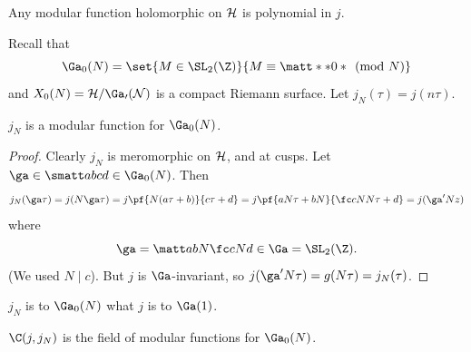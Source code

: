 \begin{cor}
Any modular function holomorphic on $\cal H$ is polynomial in $j$.
\end{cor}
Recall that
\[
\Ga_0(N)=\set{M\in \SL_2(\Z)}{M\equiv \matt **0* \pmod{N}}
\]
and $X_0(N)=\cal H/\Ga_0(N)$ is a compact Riemann surface. Let $j_N(\tau)=j(n\tau)$.
\begin{thm}
$j_N$ is a modular function for $\Ga_0(N)$. 
\end{thm}
\begin{proof}
Clearly $j_N$ is meromorphic %
on $\cal H$, and at cusps. Let $\ga\in \smatt abcd\in \Ga_0(N)$. Then
\[
j_N(\ga \tau)=j(N\ga \tau)=j\pf{N(a\tau+b)}{c\tau+d}=
j\pf{aN\tau+bN}{\fc cNN\tau +d}=j(\ga'Nz)
\]
where
\[
\ga=\matt a{bN}{\fc cN}d\in \Ga=\SL_2(\Z).
\]
(We used $N\mid c$). But $j$ is $\Ga$-invariant, so $j(\ga'N\tau)=g(N\tau)=j_N(\tau)$.
\end{proof}
$j_N$ is to $\Ga_0(N)$ what $j$ is to $\Ga(1)$.
\begin{thm}
$\C(j,j_N)$ is the field of modular functions for $\Ga_0(N)$. 
\end{thm}
